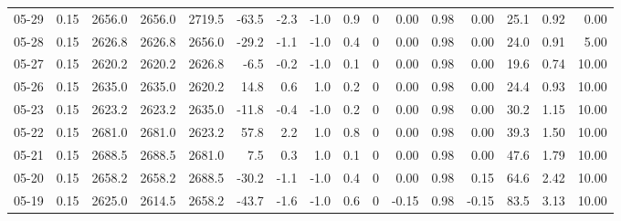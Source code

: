 \begin{threeparttable}
{\begin{tabular}{lrrrrrrrrrrrrrrr}
  05-29 &     0.15 & 2656.0 & 2656.0 & 2719.5 &      -63.5 &           -2.3 &                     -1.0 &                 0.9 &              0 &       0.00 &      0.98 &           0.00 &             25.1 &            0.92 &                   0.00 \\
  05-28 &     0.15 & 2626.8 & 2626.8 & 2656.0 &      -29.2 &           -1.1 &                     -1.0 &                 0.4 &              0 &       0.00 &      0.98 &           0.00 &             24.0 &            0.91 &                   5.00 \\
  05-27 &     0.15 & 2620.2 & 2620.2 & 2626.8 &       -6.5 &           -0.2 &                     -1.0 &                 0.1 &              0 &       0.00 &      0.98 &           0.00 &             19.6 &            0.74 &                  10.00 \\
  05-26 &     0.15 & 2635.0 & 2635.0 & 2620.2 &       14.8 &            0.6 &                      1.0 &                 0.2 &              0 &       0.00 &      0.98 &           0.00 &             24.4 &            0.93 &                  10.00 \\
  05-23 &     0.15 & 2623.2 & 2623.2 & 2635.0 &      -11.8 &           -0.4 &                     -1.0 &                 0.2 &              0 &       0.00 &      0.98 &           0.00 &             30.2 &            1.15 &                  10.00 \\
  05-22 &     0.15 & 2681.0 & 2681.0 & 2623.2 &       57.8 &            2.2 &                      1.0 &                 0.8 &              0 &       0.00 &      0.98 &           0.00 &             39.3 &            1.50 &                  10.00 \\
  05-21 &     0.15 & 2688.5 & 2688.5 & 2681.0 &        7.5 &            0.3 &                      1.0 &                 0.1 &              0 &       0.00 &      0.98 &           0.00 &             47.6 &            1.79 &                  10.00 \\
  05-20 &     0.15 & 2658.2 & 2658.2 & 2688.5 &      -30.2 &           -1.1 &                     -1.0 &                 0.4 &              0 &       0.00 &      0.98 &           0.15 &             64.6 &            2.42 &                  10.00 \\
  05-19 &     0.15 & 2625.0 & 2614.5 & 2658.2 &      -43.7 &           -1.6 &                     -1.0 &                 0.6 &              0 &      -0.15 &      0.98 &          -0.15 &             83.5 &            3.13 &                  10.00 \\

\end{tabular}}
\end{threeparttable}
